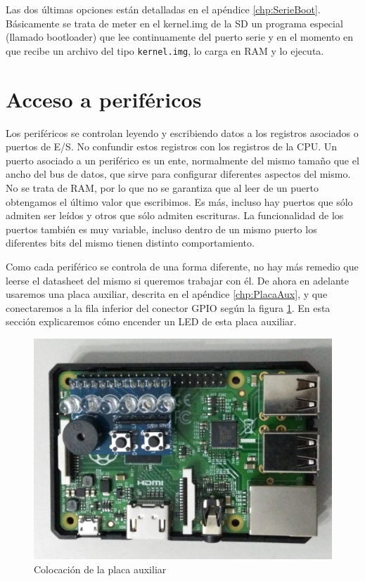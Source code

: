 Las dos últimas opciones están detalladas en el apéndice \ref{chp:SerieBoot}.
Básicamente se trata de meter en el kernel.img de la SD un programa especial (llamado
bootloader) que lee continuamente del puerto serie y en el momento en que recibe
un archivo del tipo {\tt kernel.img}, lo carga en RAM y lo ejecuta.

\section{Acceso a periféricos}

Los periféricos se controlan leyendo y escribiendo datos a los registros asociados o puertos
de E/S. No
confundir estos registros con los registros de la CPU. Un puerto asociado a un periférico
es un ente, normalmente del mismo tamaño que el ancho del bus de datos, que sirve para
configurar diferentes aspectos del mismo. No se trata de RAM, por lo que no se garantiza que
al leer de un puerto obtengamos el último valor que escribimos. Es más, incluso hay
puertos que sólo admiten ser leídos y otros que sólo admiten escrituras. La funcionalidad
de los puertos también es muy variable, incluso dentro de un mismo puerto los diferentes
bits del mismo tienen distinto comportamiento.

Como cada periférico se controla de una forma diferente, no hay más remedio que leerse
el datasheet del mismo si queremos trabajar con él. De ahora en adelante usaremos una placa
auxiliar, descrita en el apéndice \ref{chp:PlacaAux}, y que conectaremos a la fila inferior
del conector GPIO según la figura \ref{fig:posicionaux}. En esta sección explicaremos cómo
encender un LED de esta placa auxiliar.

\begin{figure}[h]
  \centering
    \includegraphics[width=14cm]{graphs/posicionaux.jpg}
  \caption{Colocación de la placa auxiliar}
  \label{fig:posicionaux}
\end{figure}


